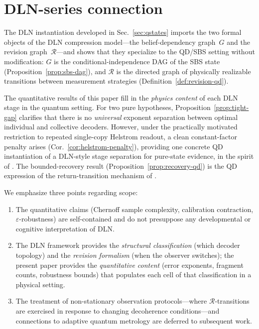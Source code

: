 \documentclass[11pt]{article}
\newcommand{\1}{\mathbf{1}}
\theoremstyle{definition}
\theoremstyle{plain}
\begin{document}
\section{DLN-series connection}
\label{sec:dln-brief}

The DLN instantiation developed in Sec.~\ref{sec:qstates} imports the
two formal objects of the DLN compression model---the belief-dependency
graph~$G$ and the revision graph~$\mathcal{R}$---and shows that they
specialize to the QD/SBS setting without modification:
$G$ is the conditional-independence DAG of the SBS state
(Proposition~\ref{prop:sbs-dag}), and
$\mathcal{R}$ is the directed graph of physically realizable transitions
between measurement strategies
(Definition~\ref{def:revision-qd}).

The quantitative results of this paper fill in the \emph{physics content}
of each DLN stage in the quantum setting.
For two pure hypotheses, Proposition~\ref{prop:tight-gap} clarifies that there is no
\emph{universal} exponent separation between optimal individual and collective decoders.
However, under the practically motivated restriction to repeated single-copy Helstrom readout,
a clean constant-factor penalty arises (Cor.~\ref{cor:helstrom-penalty}), providing one concrete
QD instantiation of a DLN-style stage separation for pure-state evidence, in the spirit of
\citep[Proposition~1(i)]{WuDLNCompression2026preprint}.
The bounded-recovery result
(Proposition~\ref{prop:recovery-qd}) is the QD expression of the
return-transition mechanism of
\citep[Proposition~1(iii)]{WuDLNCompression2026preprint}.

We emphasize three points regarding scope:
\begin{enumerate}[leftmargin=2em]
\item The quantitative claims (Chernoff sample complexity, calibration
  contraction, $\varepsilon$-robustness) are self-contained and do not
  presuppose any developmental or cognitive interpretation of DLN.
\item The DLN framework provides the \emph{structural classification}
  (which decoder topology) and the \emph{revision formalism} (when the
  observer switches); the present paper provides the \emph{quantitative
  content} (error exponents, fragment counts, robustness bounds) that
  populates each cell of that classification in a physical setting.
\item The treatment of non-stationary observation protocols---where
  $\mathcal{R}$-transitions are exercised in response to changing
  decoherence conditions---and connections to adaptive quantum
  metrology are deferred to subsequent work.
\end{enumerate}
\end{document}
